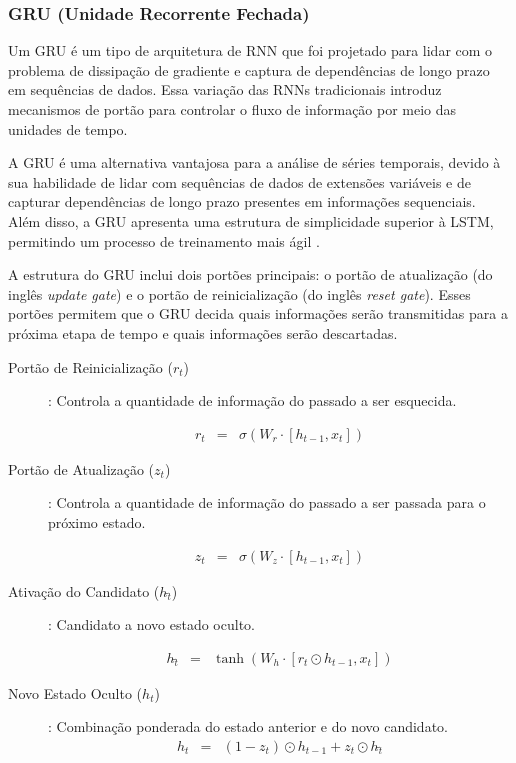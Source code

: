 \subsubsection{GRU (Unidade Recorrente Fechada)}


Um GRU é um tipo de arquitetura de RNN que foi projetado para lidar com o problema de dissipação de gradiente e captura de dependências de longo prazo em sequências de dados. Essa variação das RNNs tradicionais introduz mecanismos de portão para controlar o fluxo de informação por meio das unidades de tempo.

A GRU é uma alternativa vantajosa para a análise de séries temporais, devido à sua habilidade de lidar com sequências de dados de extensões variáveis e de capturar dependências de longo prazo presentes em informações sequenciais. Além disso, a GRU apresenta uma estrutura de simplicidade superior à LSTM, permitindo um processo de treinamento mais ágil  \cite{mastersthesis53fd58a7}.

A estrutura do GRU inclui dois portões principais: o portão de atualização (do inglês \textit{update gate}) e o portão de reinicialização (do inglês \textit{reset gate}). Esses portões permitem que o GRU decida quais informações serão transmitidas para a próxima etapa de tempo e quais informações serão descartadas.



\begin{description}
	\item[Portão de Reinicialização (\(r_t\))]: Controla a quantidade de informação do passado a ser esquecida.
	
 \begin{eqnarray}
 	r_t &=& \sigma(W_r \cdot [h_{t-1}, x_t])\label{eq:gru}
 \end{eqnarray} 

\item[Portão de Atualização (\(z_t\))]: Controla a quantidade de informação do passado a ser passada para o próximo estado.

 \begin{eqnarray}
 	z_t &=& \sigma(W_z \cdot [h_{t-1}, x_t])\label{eq:gru1}
 \end{eqnarray}

\item[Ativação do Candidato (\(h\widetilde{_t}\))]: Candidato a novo estado oculto.

\begin{eqnarray}
	h\widetilde{_t} &=& \tanh\left(W_h \cdot [r_t \odot h_{t-1}, x_t]\right)\label{eq:gru2}
\end{eqnarray}

\item[Novo Estado Oculto (\(h_t\))]: Combinação ponderada do estado anterior e do novo candidato.
\begin{eqnarray}
	h_t &=& (1 - z_t) \odot h_{t-1} + z_t \odot h\widetilde{_t}\label{eq:gru3}
\end{eqnarray}
\end{description}

